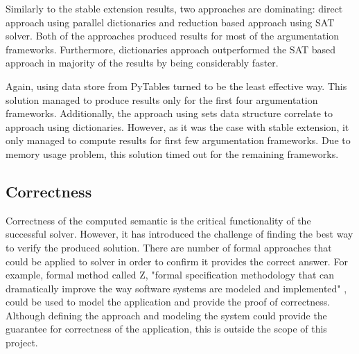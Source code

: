 Similarly to the stable extension results, two approaches are dominating: direct approach using parallel dictionaries and reduction based approach using SAT solver. Both of the approaches produced results for most of the argumentation frameworks. Furthermore, dictionaries approach outperformed the SAT based approach in majority of the results by being considerably faster.


Again, using data store from PyTables turned to be the least effective way. This solution managed to produce results only for the first four argumentation frameworks. Additionally, the approach using sets data structure correlate to approach using dictionaries. However, as it was the case with stable extension, it only managed to compute results for first few argumentation frameworks. Due to memory usage problem, this solution timed out for the remaining frameworks.


\subsection{Correctness}
Correctness of the computed semantic is the critical functionality of the successful solver. However, it has introduced the challenge of finding the best way to verify the produced solution. There are number of formal approaches that could be applied to solver in order to confirm it provides the correct answer. For example, formal method called Z, "formal specification methodology that can dramatically improve the way software systems are modeled and implemented" \citep{potter1996introduction}, could be used to model the application and provide the proof of correctness. Although defining the approach and modeling the system could provide the guarantee for correctness of the application, this is outside the scope of this project. 

